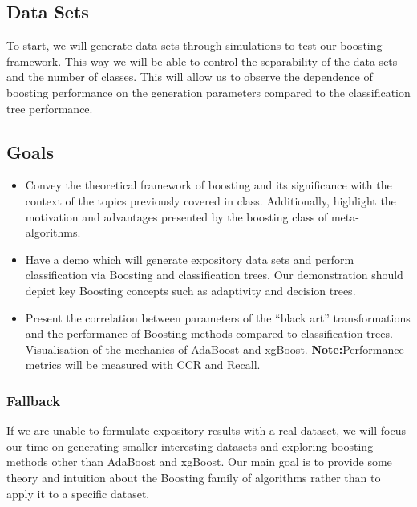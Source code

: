 \documentclass[10pt,twocolumn,letterpaper]{article}
\begin{document}
\subsection{Data Sets}

To start, we will generate data sets through simulations to test our boosting framework. This way we will be able to control the separability of the data sets and the number of classes. This will allow us to observe the dependence of boosting performance on the generation parameters compared to the classification tree performance.

\subsection{Goals}
\begin{itemize}
\item Convey the theoretical framework of boosting and its significance with the context of the topics previously covered in class. Additionally, highlight the motivation and advantages presented by the boosting class of meta-algorithms. 
\item Have a demo which will generate expository data sets and perform classification via Boosting and classification  trees. Our demonstration should depict key Boosting concepts such as adaptivity and decision trees.
\item Present the correlation between parameters of the “black art” transformations and the performance of Boosting methods compared to classification  trees. Visualisation of the mechanics of AdaBoost and xgBoost.
\newline
\newline
\textbf{Note:}Performance metrics will be measured with CCR and Recall. 
\end{itemize}

\subsubsection{Fallback}
If we are unable to formulate expository results with a real dataset, we will focus our time on generating smaller interesting datasets and exploring boosting methods other than AdaBoost and xgBoost. Our main goal is to provide some theory and intuition about the Boosting family of algorithms rather than to apply it to a specific dataset.
\end{document}
